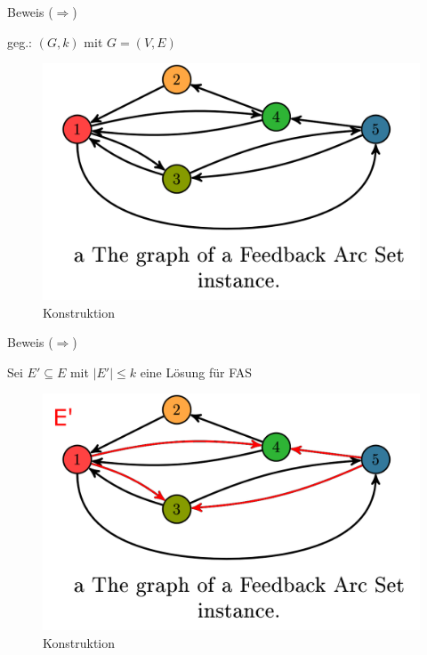 \documentclass{beamer}
\begin{document}
\begin{frame}{Beweis (\glqq $\Rightarrow$\grqq)}
\begin{pointlist}
\item geg.: $(G,k)$ mit $G=(V,E)$
\end{pointlist}

	\begin{figure}[ht]
		\includegraphics[width=.75\textwidth]{graph}
		\caption{Konstruktion}
    \end{figure}
\end{frame}

\begin{frame}{Beweis (\glqq $\Rightarrow$\grqq)}
\begin{pointlist}
\item Sei $E'\subseteq E$ mit $|E'| \leq k$ eine Lösung für FAS
\end{pointlist}
\begin{figure}[ht]
		\includegraphics[width=.75\textwidth]{graphe}
		\caption{Konstruktion}
    \end{figure}
\end{frame}
\end{document}
